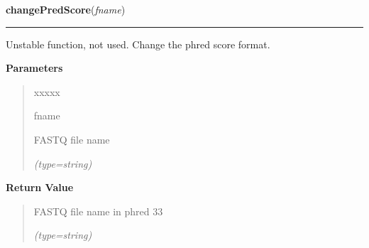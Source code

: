 \hspace{.8\funcindent}\begin{boxedminipage}{\funcwidth}

    \raggedright \textbf{changePredScore}(\textit{fname})

    \vspace{-1.5ex}

    \rule{\textwidth}{0.5\fboxrule}
\setlength{\parskip}{2ex}
    Unstable function, not used. Change the phred score format.

\setlength{\parskip}{1ex}
      \textbf{Parameters}
      \vspace{-1ex}

      \begin{quote}
        \begin{Ventry}{xxxxx}

          \item[fname]

          FASTQ file name

            {\it (type=string)}

        \end{Ventry}

      \end{quote}

      \textbf{Return Value}
    \vspace{-1ex}

      \begin{quote}
      FASTQ file name in phred 33

      {\it (type=string)}

      \end{quote}

    \end{boxedminipage}

    \label{script-BAMmaker:nbReads}

    \vspace{0.5ex}

